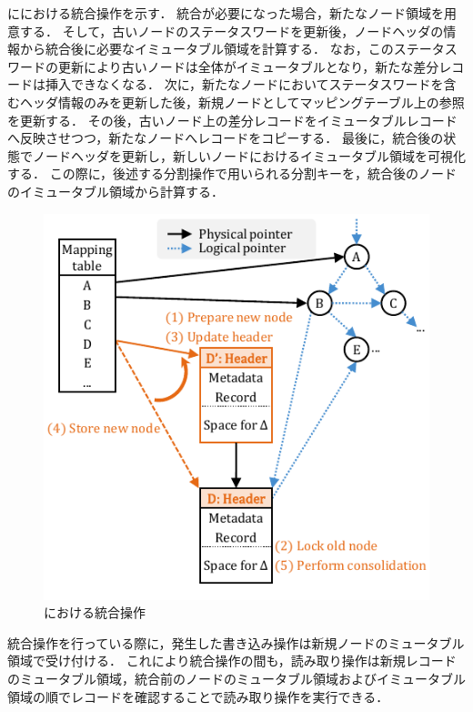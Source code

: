 \Fig{\ref{fig:bc_tree_consolidastion}}に\Bcforest{}における統合操作を示す．
統合が必要になった場合，新たなノード領域を用意する．
そして，古いノードのステータスワードを更新後，ノードヘッダの情報から統合後に必要なイミュータブル領域を計算する．
なお，このステータスワードの更新により古いノードは全体がイミュータブルとなり，新たな差分レコードは挿入できなくなる．
次に，新たなノードにおいてステータスワードを含むヘッダ情報のみを更新した後，新規ノードとしてマッピングテーブル上の参照を更新する．
その後，古いノード上の差分レコードをイミュータブルレコードへ反映させつつ，新たなノードへレコードをコピーする．
最後に，統合後の状態でノードヘッダを更新し，新しいノードにおけるイミュータブル領域を可視化する．
この際に，後述する分割操作で用いられる分割キーを，統合後のノードのイミュータブル領域から計算する．

\begin{figure}[t]
    \centering
    \includegraphics{./figures/Bc-consolidate.pdf}
    \caption{\Bcforest{}における統合操作}
    \label{fig:bc_tree_consolidastion}
\end{figure}

統合操作を行っている際に，発生した書き込み操作は新規ノードのミュータブル領域で受け付ける．
これにより統合操作の間も，読み取り操作は新規レコードのミュータブル領域，統合前のノードのミュータブル領域およびイミュータブル領域の順でレコードを確認することで読み取り操作を実行できる．

